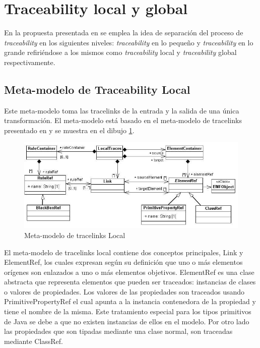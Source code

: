 \documentclass[a4paper,12pt,oneside,spanish]{book}
\begin{document}
\section{Traceability local y global}

En la propuesta presentada en \cite{GlitiaEtienDumoulin} se emplea la idea de separación del proceso de \textit{traceability} en los siguientes niveles: \textit{traceability} en lo pequeño y \textit{traceability} en lo grande refiriéndose a los mismos como \textit{traceability} local y \textit{traceability} global respectivamente.

\subsection{Meta-modelo de Traceability Local}

Este meta-modelo toma las tracelinks de la entrada y la salida de una única transformación. El meta-modelo está basado en el meta-modelo de tracelinks presentado en \cite{Jouault} y se muestra en el dibujo \ref{fig:LocalTraceMetamodel}.

\begin{figure}[hbtp]
\centering
\includegraphics[scale=.58]{./img/LocalTraceMetamodel}
\caption{Meta-modelo de tracelinks Local}
\label{fig:LocalTraceMetamodel}
\end{figure}

El meta-modelo de tracelinks local contiene dos conceptos principales, Link y ElementRef, los cuales expresan según su definición que uno o más elementos orígenes son enlazados a uno o más elementos objetivos. ElementRef es una clase abstracta que representa elementos que pueden ser traceados: instancias de clases o valores de propiedades. Los valores de las propiedades son traceados usando PrimitivePropertyRef el cual apunta a la instancia contenedora de la propiedad y tiene el nombre de la misma. Este tratamiento especial para los tipos primitivos de \textsf{Java} se debe a que no existen instancias de ellos en el modelo. Por otro lado las propiedades que son tipadas mediante una clase normal, son traceadas mediante ClassRef.
\end{document}
